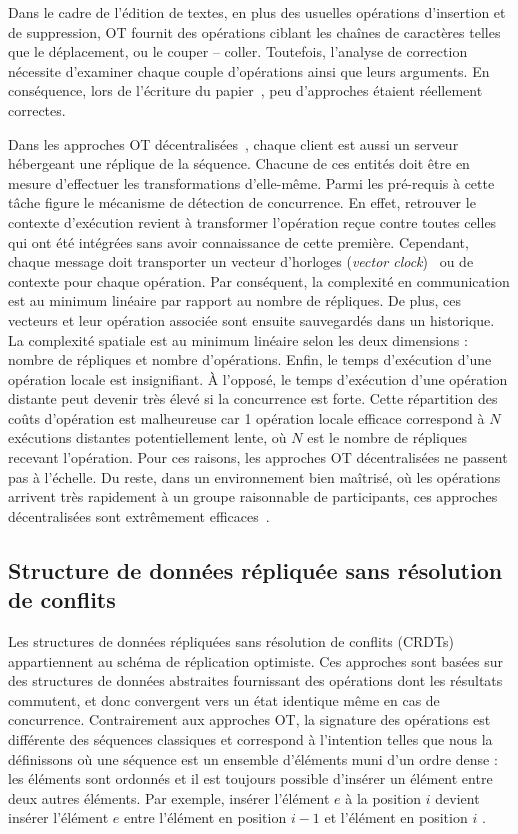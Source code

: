 Dans le cadre de l'édition de textes, en plus des usuelles opérations
d'insertion et de suppression, OT fournit des opérations ciblant les chaînes de
caractères telles que le déplacement, ou le couper -- coller. Toutefois,
l'analyse de correction nécessite d'examiner chaque couple d'opérations ainsi
que leurs arguments. En conséquence, lors de l'écriture du
papier~\cite{imine2003proving}, peu d'approches étaient réellement
correctes. 

Dans les approches OT décentralisées~\cite{sun2009contextbased}, chaque client
est aussi un serveur hébergeant une réplique de la séquence. Chacune de ces
entités doit être en mesure d'effectuer les transformations d'elle-même. Parmi
les pré-requis à cette tâche figure le mécanisme de détection de concurrence. En
effet, retrouver le contexte d'exécution revient à transformer l'opération reçue
contre toutes celles qui ont été intégrées sans avoir connaissance de cette
première. Cependant, chaque message doit transporter un vecteur d'horloges
(\emph{vector clock})~\cite{lamport1978time} ou de contexte pour chaque
opération. Par conséquent, la complexité en communication est au minimum
linéaire par rapport au nombre de répliques. De plus, ces vecteurs et leur
opération associée sont ensuite sauvegardés dans un historique. La complexité
spatiale est au minimum linéaire selon les deux dimensions : nombre de répliques
et nombre d'opérations. Enfin, le temps d'exécution d'une opération locale est
insignifiant. À l'opposé, le temps d'exécution d'une opération distante peut
devenir très élevé si la concurrence est forte. Cette répartition des coûts
d'opération est malheureuse car 1 opération locale efficace correspond à $N$
exécutions distantes potentiellement lente, où $N$ est le nombre de répliques
recevant l'opération. Pour ces raisons, les approches OT décentralisées ne
passent pas à l'échelle. Du reste, dans un environnement bien maîtrisé, où les
opérations arrivent très rapidement à un groupe raisonnable de participants, ces
approches décentralisées sont extrêmement efficaces~\cite{mehdi2014merging}.

\subsection{Structure de données répliquée sans résolution de conflits}
\label{repl:subsec:crdts}

Les structures de données répliquées sans résolution de conflits
(CRDTs)~\cite{shapiro2011comprehensive, shapiro2011conflict} appartiennent au
schéma de réplication optimiste. Ces approches sont basées sur des structures de
données abstraites fournissant des opérations dont les résultats commutent, et
donc convergent vers un état identique même en cas de concurrence. Contrairement
aux approches OT, la signature des opérations est différente des séquences \og
classiques \fg et correspond à l'intention telles que nous la définissons
où une séquence est un ensemble d'éléments muni d'un ordre dense : les éléments
sont ordonnés et il est toujours possible d'insérer un élément entre deux autres
éléments. Par exemple, \og insérer l'élément $e$ à la position $i$ \fg devient
\og insérer l'élément $e$ entre l'élément en position $i-1$ et l'élément en
position $i$ \fg.

